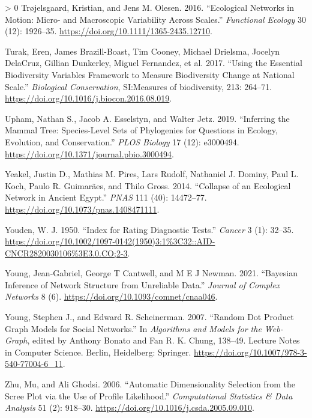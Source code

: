 \documentclass[10pt,oneside]{article}
\newlength{\cslhangindent}
\newenvironment{CSLReferences}[3] %
 {%
  \setlength{\parindent}{0pt}
  \ifodd #1 \everypar{\setlength{\hangindent}{\cslhangindent}}\ignorespaces\fi
  \ifnum #2 > 0
  \setlength{\parskip}{#2\baselineskip}
  \fi
 }%
 {}
\begin{document}
\begin{CSLReferences}{1}{0}
\leavevmode\hypertarget{ref-Trojelsgaard2016EcoNet}{}%
Trøjelsgaard, Kristian, and Jens M. Olesen. 2016. {``Ecological Networks
in Motion: Micro- and Macroscopic Variability Across Scales.''}
\emph{Functional Ecology} 30 (12): 1926--35.
\url{https://doi.org/10.1111/1365-2435.12710}.

\leavevmode\hypertarget{ref-Turak2017UsiEss}{}%
Turak, Eren, James Brazill-Boast, Tim Cooney, Michael Drielsma, Jocelyn
DelaCruz, Gillian Dunkerley, Miguel Fernandez, et al. 2017. {``Using the
Essential Biodiversity Variables Framework to Measure Biodiversity
Change at National Scale.''} \emph{Biological Conservation}, SI:Measures
of biodiversity, 213: 264--71.
\url{https://doi.org/10.1016/j.biocon.2016.08.019}.

\leavevmode\hypertarget{ref-Upham2019InfMam}{}%
Upham, Nathan S., Jacob A. Esselstyn, and Walter Jetz. 2019.
{``Inferring the Mammal Tree: Species-Level Sets of Phylogenies for
Questions in Ecology, Evolution, and Conservation.''} \emph{PLOS
Biology} 17 (12): e3000494.
\url{https://doi.org/10.1371/journal.pbio.3000494}.

\leavevmode\hypertarget{ref-Yeakel2014ColEco}{}%
Yeakel, Justin D., Mathias M. Pires, Lars Rudolf, Nathaniel J. Dominy,
Paul L. Koch, Paulo R. Guimarães, and Thilo Gross. 2014. {``Collapse of
an Ecological Network in Ancient Egypt.''} \emph{PNAS} 111 (40):
14472--77. \url{https://doi.org/10.1073/pnas.1408471111}.

\leavevmode\hypertarget{ref-Youden1950IndRat}{}%
Youden, W. J. 1950. {``Index for Rating Diagnostic Tests.''}
\emph{Cancer} 3 (1): 32--35.
\url{https://doi.org/10.1002/1097-0142(1950)3:1\%3C32::AID-CNCR2820030106\%3E3.0.CO;2-3}.

\leavevmode\hypertarget{ref-Young2021BayInf}{}%
Young, Jean-Gabriel, George T Cantwell, and M E J Newman. 2021.
{``Bayesian Inference of Network Structure from Unreliable Data.''}
\emph{Journal of Complex Networks} 8 (6).
\url{https://doi.org/10.1093/comnet/cnaa046}.

\leavevmode\hypertarget{ref-Young2007RanDot}{}%
Young, Stephen J., and Edward R. Scheinerman. 2007. {``Random Dot
Product Graph Models for Social Networks.''} In \emph{Algorithms and
Models for the Web-Graph}, edited by Anthony Bonato and Fan R. K. Chung,
138--49. Lecture Notes in Computer Science. Berlin, Heidelberg:
Springer. \url{https://doi.org/10.1007/978-3-540-77004-6_11}.

\leavevmode\hypertarget{ref-Zhu2006AutDim}{}%
Zhu, Mu, and Ali Ghodsi. 2006. {``Automatic Dimensionality Selection
from the Scree Plot via the Use of Profile Likelihood.''}
\emph{Computational Statistics \& Data Analysis} 51 (2): 918--30.
\url{https://doi.org/10.1016/j.csda.2005.09.010}.

\end{CSLReferences}
\end{document}
